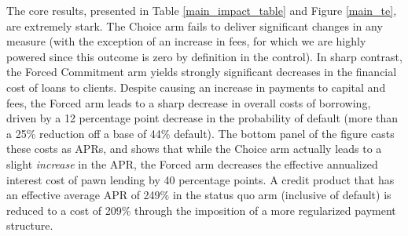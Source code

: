 \documentclass[oneside,11pt]{article}
\begin{document}








The core results, presented in Table \ref{main_impact_table} and Figure \ref{main_te}, are extremely stark.  The Choice arm fails to deliver significant changes in any measure (with the exception of an increase in fees, for which we are highly powered since this outcome is zero by definition in the control).  In sharp contrast, the Forced Commitment arm yields strongly significant decreases in the financial cost of loans to clients.  Despite causing an increase in payments to capital and fees, the Forced arm leads to a sharp decrease in overall costs of borrowing, driven by a 12 percentage point decrease in the probability of default (more than a 25\% reduction off a base of 44\% default).  The bottom panel of the figure casts these costs as APRs, and shows that while the Choice arm actually leads to a slight \textit{increase} in the APR, the Forced arm decreases the effective annualized interest cost of pawn lending by 40 percentage points.  A credit product that has an effective average APR of 249\% in the status quo arm (inclusive of default) is reduced to a cost of 209\% through the imposition of a more regularized payment structure.  
\end{document}
